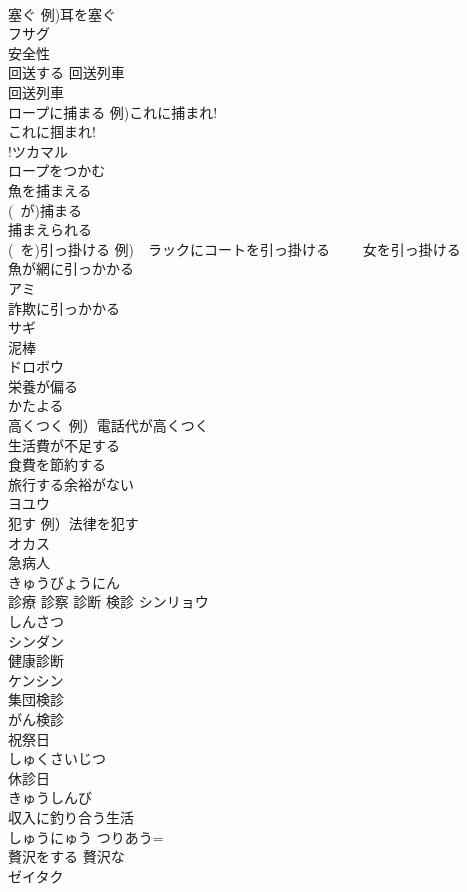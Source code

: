 \documentclass[8pt]{extreport}
\begin{document}
\begin{CJK}{UTF8}{min}
\\	塞ぐ 例)耳を塞ぐ	
\\	フサグ
\\	安全性	
\\	回送する 回送列車	
\\	回送列車
\\	ロープに捕まる 例)これに捕まれ! 
\\	これに掴まれ!	
\\	!ツカマル
\\	ロープをつかむ	
\\	魚を捕まえる	
\\	(~が)捕まる 
\\	捕まえられる	
\\	(~を)引っ掛ける 例)　ラックにコートを引っ掛ける 　　女を引っ掛ける	
\\	魚が網に引っかかる	
\\	アミ
\\	詐欺に引っかかる	
\\	サギ
\\	泥棒	
\\	ドロボウ
\\	栄養が偏る	
\\	かたよる 
\\	高くつく 例）電話代が高くつく	
\\	生活費が不足する	
\\	食費を節約する	
\\	旅行する余裕がない	
\\	ヨユウ
\\	犯す 例）法律を犯す	
\\	オカス
\\	急病人	
\\	きゅうびょうにん
\\	診療 診察 診断 検診	シンリョウ 
\\	しんさつ
\\	シンダン 
\\	健康診断 
\\	ケンシン 
\\	集団検診
\\	がん検診
\\	祝祭日	
\\	しゅくさいじつ
\\	休診日	
\\	きゅうしんび
\\	収入に釣り合う生活	
\\	しゅうにゅう つりあう=
\\	贅沢をする 贅沢な	
\\	ゼイタク

\end{CJK}
\end{document}
